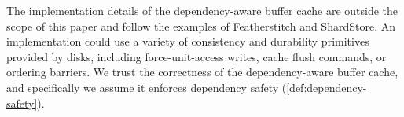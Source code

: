 The implementation details of the dependency-aware buffer cache
are outside the scope of this paper and follow the examples of Featherstitch and ShardStore.
An implementation could use a variety of consistency and durability primitives provided by disks,
including force-unit-access writes, cache flush commands, or ordering barriers.
We trust the correctness of the dependency-aware buffer cache,
and specifically we assume it enforces dependency safety (\cref{def:dependency-safety}).





